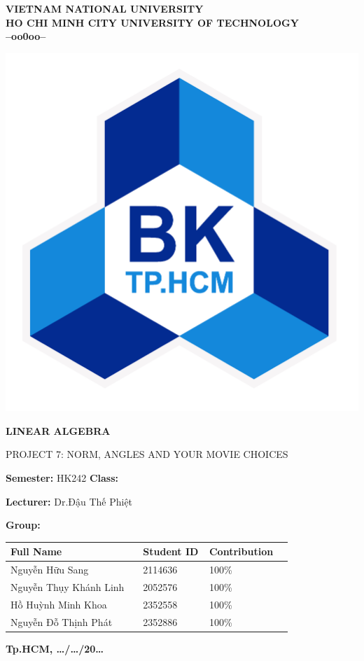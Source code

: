 \BgThispage
{}
\fontsize{13}{14}\selectfont
\begin{center}
	\Large\textbf{VIETNAM NATIONAL UNIVERSITY \\
		HO CHI MINH CITY UNIVERSITY OF TECHNOLOGY
		\\--oo0oo--}
\end{center}
\vspace{0.5cm}
\begin{center}
	\includegraphics[width=0.3\linewidth]{sections/pic/01_logobachkhoatoi.png}
\end{center}
\vspace{0.4cm}
\begin{center}
	\LARGE\textbf{LINEAR ALGEBRA}
	\vspace{0.1cm}
	
	\Large{PROJECT 7: NORM, ANGLES AND YOUR MOVIE CHOICES  }
\end{center}
\vspace{1cm}

\textbf{Semester: } HK242 \hspace{1cm} \textbf{Class:} 

\textbf{Lecturer:} Dr.Đậu Thế Phiệt

\textbf{Group:} 

\Large

\begin{tabular}{| p{0.4\linewidth} | p{0.2\linewidth} | p{0.2\linewidth} |}
	\hline
	Full Name & Student ID & Contribution \\
	\hline
	Nguyễn Hữu Sang & 2114636 & 100\% \\
	\hline
	Nguyễn Thụy Khánh Linh	& 2052576 & 100\% \\
	\hline
	Hồ Huỳnh Minh Khoa	& 2352558 & 100\% \\
	\hline
	Nguyễn Đỗ Thịnh Phát & 2352886	 & 100\% \\
	\hline
\end{tabular}

\vspace{2cm}
\begin{center}
	\fontsize{8pt}{5pt}\selectfont\textbf{Tp.HCM, \dots/\dots/20\dots}
\end{center}

\newpage
{}
\fontsize{13}{14}\selectfont
\tableofcontents
\listoffigures
\listoftables